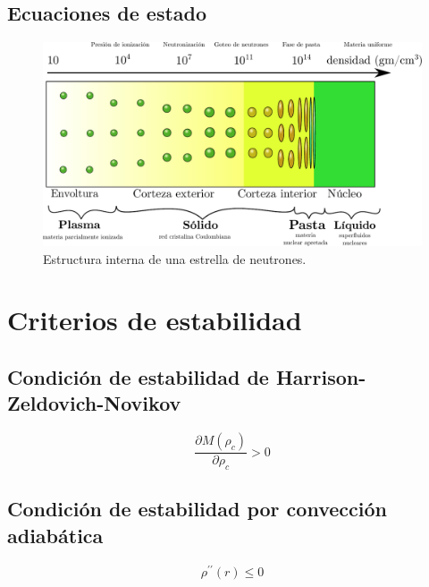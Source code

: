 \subsection{Ecuaciones de estado}

\begin{figure}[H]
    \centering
    \includegraphics[width=400pt]{figures/Density.pdf}
    \caption[Estructura interna de una estrella de neutrones]{Estructura interna de una estrella de neutrones.\protect\footnotemark}
    \label{NSS}
\end{figure}

\section{Criterios de estabilidad}

\subsection{Condición de estabilidad de Harrison-Zeldovich-Novikov}


\begin{equation}
    \frac { \partial M \left( \rho _ { c } \right) } { \partial \rho _ { c } } > 0
\end{equation}


\subsection{Condición de estabilidad por convección adiabática}
\begin{equation}
    \rho ^ { \prime \prime } ( r ) \leq 0
\end{equation}
